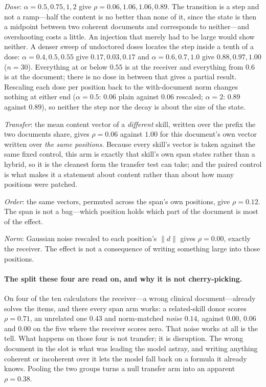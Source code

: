 \documentclass{article}
\newcommand{\dvec}{\ensuremath{d}}
\begin{document}
\emph{Dose}: $\alpha = 0.5, 0.75, 1, 2$ give $\rho = 0.06, 1.06, 1.06, 0.89$.
The transition is a step and not a ramp---half the content is no better than
none of it, since the state is then a midpoint between two coherent documents and
corresponds to neither---and overshooting costs a little. An injection that
merely had to be large would show neither. A denser sweep of undoctored doses
locates the step inside a tenth of a dose: $\alpha = 0.4, 0.5, 0.55$ give
$0.17, 0.03, 0.17$ and $\alpha = 0.6, 0.7, 1.0$ give $0.88, 0.97, 1.00$
($n=30$). Everything at or below $0.55$ is at the receiver and everything from
$0.6$ is at the document; there is no dose in between that gives a partial
result. Rescaling each dose per position back
to the with-document norm changes nothing at either end ($\alpha = 0.5$: $0.06$
plain against $0.06$ rescaled; $\alpha = 2$: $0.89$ against $0.89$), so neither
the step nor the decay is about the size of the state.

\emph{Transfer}: the mean content vector of a \emph{different} skill, written
over the prefix the two documents share, gives $\rho = 0.06$ against $1.00$ for
this document's own vector written over \emph{the same positions}. Because every
skill's vector is taken against the same fixed control, this arm is exactly that
skill's own span states rather than a hybrid, so it is the cleanest form the
transfer test can take; and the paired control is what makes it a statement about
content rather than about how many positions were patched.

\emph{Order}: the same vectors, permuted across the span's own positions, give
$\rho = 0.12$. The span is not a bag---which position holds which part of the
document is most of the effect.

\emph{Norm}: Gaussian noise rescaled to each position's $\|\dvec\|$ gives
$\rho = 0.00$, exactly the receiver. The effect is not a consequence of writing
something large into those positions.

\paragraph{The split these four are read on, and why it is not cherry-picking.}
On four of the ten calculators the receiver---a wrong clinical document---already
solves the items, and there every span arm works: a related-skill donor scores
$\rho = 0.71$, an unrelated one $0.43$ and norm-matched \emph{noise} $0.14$,
against $0.00$, $0.06$ and $0.00$ on the five where the receiver scores zero.
That noise works at all is the tell. What happens on those four is not transfer; it
is disruption. The wrong document in the slot is what was leading the model
astray, and writing anything coherent or incoherent over it lets the model fall
back on a formula it already knows. Pooling the two groups turns a null transfer
arm into an apparent $\rho = 0.38$.
\end{document}
